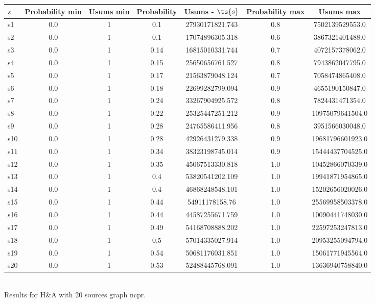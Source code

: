 \documentclass{article}
\begin{document}
\noindent\begin{tabular}{|l|c|c|c|c|c|c|}
\hline
$s$& Probability min & Usums min & Probability & Usums - $\ts{s}$ & Probability max & Usums max\\
\hline
s1 &0.0 & 1 & 0.1 & 27930171821.743 & 0.8 & 7502139529553.0\\
\hline
s2 &0.0 & 1 & 0.1 & 17074896305.318 & 0.6 & 3867321401488.0\\
\hline
s3 &0.0 & 1 & 0.14 & 16815010331.744 & 0.7 & 4072157378062.0\\
\hline
s4 &0.0 & 1 & 0.15 & 25650656761.527 & 0.8 & 7943862047795.0\\
\hline
s5 &0.0 & 1 & 0.17 & 21563879048.124 & 0.7 & 7058474865408.0\\
\hline
s6 &0.0 & 1 & 0.18 & 22699282799.094 & 0.9 & 4655190150847.0\\
\hline
s7 &0.0 & 1 & 0.24 & 33267904925.572 & 0.8 & 7824431471354.0\\
\hline
s8 &0.0 & 1 & 0.22 & 25325447251.212 & 0.9 & 10975079641504.0\\
\hline
s9 &0.0 & 1 & 0.28 & 24765586411.956 & 0.8 & 3951566030048.0\\
\hline
s10 &0.0 & 1 & 0.28 & 42926431279.338 & 0.9 & 19681796601923.0\\
\hline
s11 &0.0 & 1 & 0.34 & 38323198745.014 & 0.9 & 15444437704525.0\\
\hline
s12 &0.0 & 1 & 0.35 & 45067513330.818 & 1.0 & 10452866070339.0\\
\hline
s13 &0.0 & 1 & 0.4 & 53820541202.109 & 1.0 & 19941871954865.0\\
\hline
s14 &0.0 & 1 & 0.4 & 46868248548.101 & 1.0 & 15202656020026.0\\
\hline
s15 &0.0 & 1 & 0.44 & 54911178158.76 & 1.0 & 25569958503378.0\\
\hline
s16 &0.0 & 1 & 0.44 & 44587255671.759 & 1.0 & 10090441748030.0\\
\hline
s17 &0.0 & 1 & 0.49 & 54168708888.202 & 1.0 & 22597253247813.0\\
\hline
s18 &0.0 & 1 & 0.5 & 57014335027.914 & 1.0 & 20953255094794.0\\
\hline
s19 &0.0 & 1 & 0.54 & 50681176031.851 & 1.0 & 15061771945564.0\\
\hline
s20 &0.0 & 1 & 0.53 & 52488445768.091 & 1.0 & 13636940758840.0\\
\hline
\end{tabular}\\

\noindent Results for H\&A with 20 sources graph ncpr.
\end{document}
